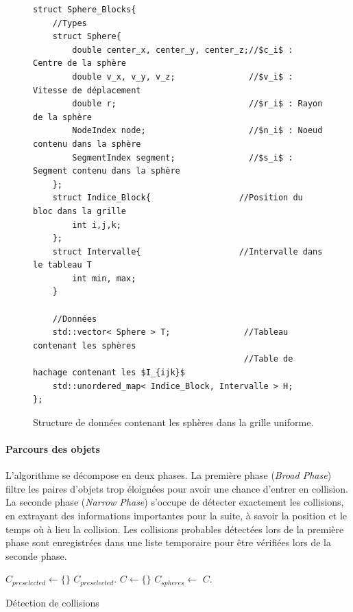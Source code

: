 \documentclass[11pt,class=article,float=false,crop=false]{standalone}
\begin{document}
\begin{figure}[H]
\begin{verbatim} 
struct Sphere_Blocks{
	//Types
	struct Sphere{
		double center_x, center_y, center_z;//$c_i$ : Centre de la sphère 
		double v_x, v_y, v_z;               //$v_i$ : Vitesse de déplacement
		double r;                           //$r_i$ : Rayon de la sphère
		NodeIndex node;                     //$n_i$ : Noeud contenu dans la sphère
		SegmentIndex segment;               //$s_i$ : Segment contenu dans la sphère
	};	
	struct Indice_Block{                  //Position du bloc dans la grille
		int i,j,k;
	};
	struct Intervalle{                    //Intervalle dans le tableau T
		int min, max;
	}
	
	//Données
	std::vector< Sphere > T;               //Tableau contenant les sphères
	                                       //Table de hachage contenant les $I_{ijk}$
	std::unordered_map< Indice_Block, Intervalle > H;
};
\end{verbatim}
\caption{Structure de données contenant les sphères dans la grille uniforme.}
\label{fig:structure_grille}
\end{figure}



\paragraph{Parcours des objets}
L'algorithme se décompose en deux phases. La première phase (\textit{Broad Phase}) filtre les paires d'objets trop éloignées pour avoir une chance d'entrer en collision. La seconde phase (\textit{Narrow Phase}) s'occupe de détecter exactement les collisions, en extrayant des informations importantes pour la suite, à savoir la position et le temps où à lieu la collision. Les collisions probables détectées lors de la première phase sont enregistrées dans une liste temporaire pour être vérifiées lors de la seconde phase.

\begin{algorithm}[H]
	\SetAlgoLined
	\LinesNumbered
	\SetAlgoNoEnd	
	\DontPrintSemicolon
	$C_{preselected} \longleftarrow \{\}$\;
	{
		{
			{
				{
					{
						$C_{preselected}$.\;
					}
				}
			}
		}
	}
	$C \longleftarrow \{\}$\;
	{
		$C_{spheres} \longleftarrow $ \;
		$C$.\;
	}

\caption{Détection de collisions}
\end{algorithm}
\end{document}
